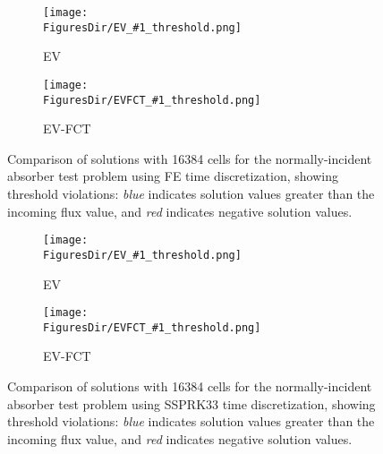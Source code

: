 \documentclass{article}
\newcommand{\FiguresDir}{../images}
\newcommand{\FigureType}{figure}
\begin{document}
\newcommand{\MyFigure}[1]{
\begin{\FigureType}[htb]
   \centering
   \begin{subfigure}{0.45\textwidth}
      \texttt{[image: \\FiguresDir/EV\_\#1\_threshold.png]}
      \caption{EV}
   \end{subfigure}
   \begin{subfigure}{0.45\textwidth}
      \texttt{[image: \\FiguresDir/EVFCT\_\#1\_threshold.png]}
      \caption{EV-FCT}
   \end{subfigure}
   \caption{Comparison of solutions with 16384 cells for the normally-incident
     absorber test problem using #1 time discretization, showing
     threshold violations: \emph{blue} indicates solution values greater than the
     incoming flux value, and \emph{red} indicates negative solution values.}
\end{\FigureType}
}

\MyFigure{FE}

\MyFigure{SSPRK33}
\end{document}

